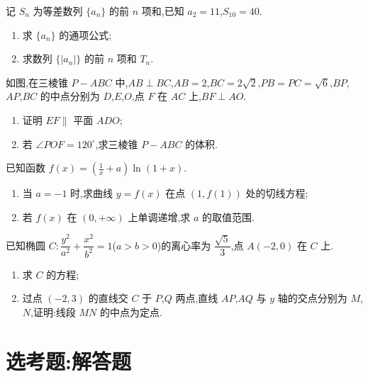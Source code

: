 \begin{problem}
记 \(S_n\) 为等差数列 \(\{a_n\}\) 的前 \(n\) 项和,已知 \(a_2=11\),\(S_{10}=40\).
\begin{enumerate}
\item 求 \(\{a_n\}\) 的通项公式;
\item 求数列 \(\{|a_n|\}\) 的前 \(n\) 项和 \(T_n\).
\end{enumerate}

\end{problem}

\begin{problem}
如图,在三棱锥 \(P-ABC\) 中,\(AB\perp BC\),\(AB=2\),\(BC=2\sqrt2\),\(PB=PC=\sqrt6\),\(BP\),\(AP\),\(BC\) 的中点分别为 \(D\),\(E\),\(O\),点 \(F\) 在 \(AC\) 上,\(BF\perp AO\).
\begin{enumerate}
\item 证明 \(EF\parallel\) 平面 \(ADO\);
\item 若 \(\angle POF=120^\circ\),求三棱锥 \(P-ABC\) 的体积.
\end{enumerate}

\end{problem}

\begin{problem}
已知函数 \(f(x)=\left(\frac1x+a\right)\ln(1+x)\).
\begin{enumerate}
\item 当 \(a=-1\) 时,求曲线 \(y=f(x)\) 在点 \((1,f(1))\) 处的切线方程;
\item 若 \(f(x)\) 在 \((0,+\infty)\) 上单调递增,求 \(a\) 的取值范围.
\end{enumerate}

\end{problem}

\begin{problem}
已知椭圆 \(C:\dfrac{y^2}{a^2}+\dfrac{x^2}{b^2}=1\)(\(a>b>0\))的离心率为 \(\dfrac{\sqrt5}{3}\),点 \(A(-2,0)\) 在 \(C\) 上.
\begin{enumerate}
\item 求 \(C\) 的方程;
\item 过点 \((-2,3)\) 的直线交 \(C\) 于 \(P\),\(Q\) 两点,直线 \(AP\),\(AQ\) 与 \(y\) 轴的交点分别为 \(M\),\(N\),证明:线段 \(MN\) 的中点为定点.
\end{enumerate}

\end{problem}

\section{选考题:解答题}

